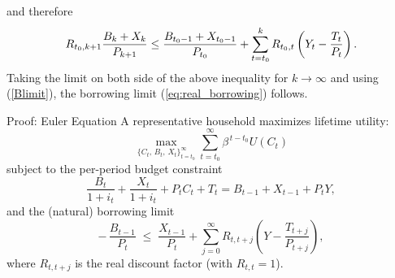 \documentclass[11pt,aspectratio=169]{beamer}
\begin{document}
\begin{frame}
and therefore%
\begin{equation*}
R_{t_{0},k+1}\frac{B_{k}+X_{k}}{P_{k+1}}\leq \frac{B_{t_{0}-1}+X_{t_{0}-1}}{%
P_{t_{0}}}+\sum_{t=t_{0}}^{k}R_{t_{0},t}\left( Y_{t}-\frac{T_{t}}{P_{t}}%
\right) .
\end{equation*}%
Taking the limit on both side of the above inequality for $k\rightarrow
\infty $ and using (\ref{Blimit}), the borrowing limit (\ref{eq:real_borrowing}) follows.
\begin{center}
\hyperlink{limit}{}
\end{center}
\end{frame}

\begin{frame}[label=euler_proof]{Proof: Euler Equation}
A representative household maximizes lifetime utility:
\begin{equation} \label{eq:utility}
\max_{\{C_t,\,B_t,\,X_t\}_{t=t_0}^\infty} 
\sum_{t=t_0}^{\infty} \beta^{\,t-t_0} U(C_t)
\end{equation}
subject to the per-period budget constraint
\begin{equation} \label{eq:budget}
\frac{B_t}{1+i_t} + \frac{X_t}{1+i_t} + P_t C_t + T_t
= B_{t-1} + X_{t-1} + P_t Y,
\end{equation}
and the (natural) borrowing limit
\begin{equation} \label{eq:borrowing}
-\,\frac{B_{t-1}}{P_t} \;\le\; \frac{X_{t-1}}{P_t} 
+ \sum_{j=0}^{\infty} R_{t,t+j} \!\left( Y - \frac{T_{t+j}}{P_{t+j}} \right),
\end{equation}
where $R_{t,t+j}$ is the real discount factor (with $R_{t,t}=1$).
\end{frame}
\end{document}
